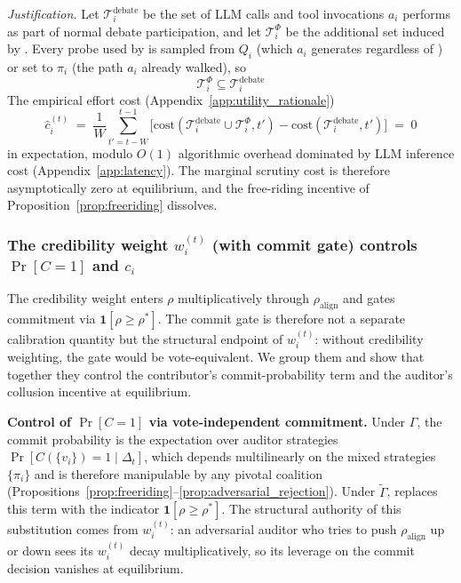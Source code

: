 \textit{Justification.}
Let $\mathcal{T}_i^{\text{debate}}$ be the set of LLM calls and tool
invocations $a_i$ performs as part of normal debate participation, and
let $\mathcal{T}_i^{\Phi}$ be the additional set induced by \system.
Every probe used by \system is sampled from $Q_i$ (which $a_i$
generates regardless of \system) or set to $\pi_i$ (the path $a_i$
already walked), so
\[
\mathcal{T}_i^{\Phi} \subseteq \mathcal{T}_i^{\text{debate}}
\]
The empirical effort cost (Appendix~\ref{app:utility_rationale})
\[
\widehat c_i^{(t)} \;=\; \frac{1}{W}\sum_{t'=t-W}^{t-1}\big[\text{cost}(\mathcal{T}_i^{\text{debate}} \cup \mathcal{T}_i^{\Phi}, t') - \text{cost}(\mathcal{T}_i^{\text{debate}}, t')\big] \;=\; 0
\]
in expectation, modulo $O(1)$ algorithmic overhead dominated by LLM
inference cost (Appendix~\ref{app:latency}). The marginal scrutiny cost
is therefore asymptotically zero at equilibrium, and the free-riding
incentive of Proposition~\ref{prop:freeriding} dissolves.

\subsubsection{The credibility weight \texorpdfstring{$w_i^{(t)}$}{w\_i} (with commit gate) controls \texorpdfstring{$\Pr[C{=}1]$}{Pr[C=1]} and \texorpdfstring{$c_i$}{c\_i}}

The credibility weight enters $\rho$ multiplicatively through
$\rho_{\text{align}}$ and gates commitment via
$\mathbf{1}[\rho \geq \rho^*]$. The commit gate is therefore not a
separate calibration quantity but the structural endpoint of $w_i^{(t)}$:
without credibility weighting, the gate would be vote-equivalent. We
group them and show that together they control the contributor's
commit-probability term and the auditor's collusion incentive at
equilibrium.

\textbf{Control of $\Pr[C{=}1]$ via vote-independent commitment.}
Under $\Gamma$, the commit probability is the expectation over auditor
strategies $\Pr[C(\{v_i\})=1\mid\Delta_t]$, which depends multilinearly
on the mixed strategies $\{\pi_i\}$ and is therefore manipulable by any
pivotal coalition (Propositions~\ref{prop:freeriding}--\ref{prop:adversarial_rejection}).
Under $\widetilde\Gamma$, \system replaces this term with the indicator
$\mathbf{1}[\rho \geq \rho^*]$. The structural authority of this
substitution comes from $w_i^{(t)}$: an adversarial auditor who tries
to push $\rho_{\text{align}}$ up or down sees its $w_i^{(t)}$ decay
multiplicatively, so its leverage on the commit decision vanishes at
equilibrium.

